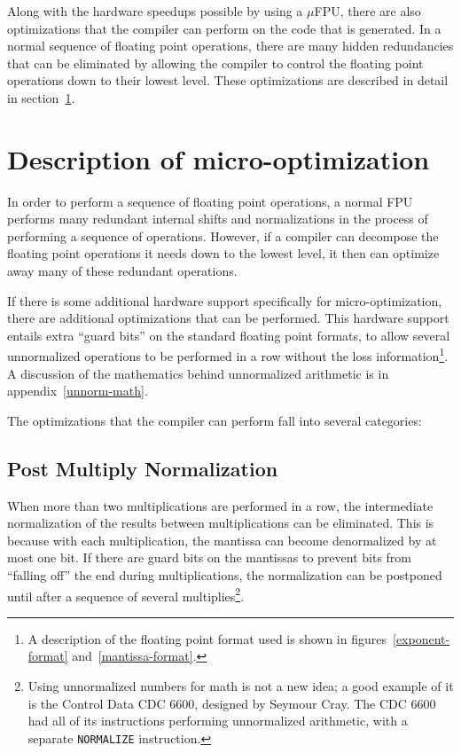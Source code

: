 Along with the hardware speedups possible by using a $\mu$FPU, there are
also optimizations that the compiler can perform on the code that is
generated.  In a normal sequence of floating point operations, there are
many hidden redundancies that can be eliminated by allowing the compiler to
control the floating point operations down to their lowest level.  These
optimizations are described in detail in section~\ref{ch1:opts}.

\section{Description of micro-optimization}\label{ch1:opts}

In order to perform a sequence of floating point operations, a normal FPU
performs many redundant internal shifts and normalizations in the process of
performing a sequence of operations.  However, if a compiler can
decompose the floating point operations it needs down to the lowest level,
it then can optimize away many of these redundant operations.  

If there is some additional hardware support specifically for
micro-optimization, there are additional optimizations that can be
performed.  This hardware support entails extra ``guard bits'' on the
standard floating point formats, to allow several unnormalized operations to
be performed in a row without the loss information\footnote{A description of
the floating point format used is shown in figures~\ref{exponent-format}
and~\ref{mantissa-format}.}.  A discussion of the mathematics behind
unnormalized arithmetic is in appendix~\ref{unnorm-math}.

The optimizations that the compiler can perform fall into several categories:

\subsection{Post Multiply Normalization}

When more than two multiplications are performed in a row, the intermediate
normalization of the results between multiplications can be eliminated.
This is because with each multiplication, the mantissa can become
denormalized by at most one bit.  If there are guard bits on the mantissas
to prevent bits from ``falling off'' the end during multiplications, the
normalization can be postponed until after a sequence of several
multiplies\footnote{Using unnormalized numbers for math is not a new idea; a
good example of it is the Control Data CDC 6600, designed by Seymour Cray.
\cite{thornton:cdc6600} The CDC 6600 had all of its instructions performing
unnormalized arithmetic, with a separate {\tt NORMALIZE} instruction.}.

